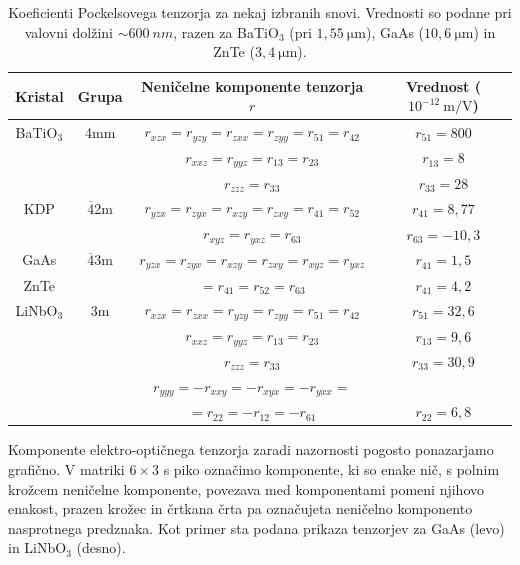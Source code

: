 \begin{table}[h!]
 \centering
\begin{tabular}{|c|c|c|c|} \hline  
      Kristal & Grupa & Neničelne komponente tenzorja $r$ & Vrednost ($10^{-12}~\si{\m/\V}$)\\ \hline
      BaTiO$_3$\index{BaTiO$_3$} & 4mm & $r_{xzx} = r_{yzy} = r_{zxx} = r_{zyy} = 
      r_{51} = r_{42}$  &
	    $r_{51} = 800$ \\
	      & & $r_{xxz} = r_{yyz} = r_{13} = r_{23}$ &  $r_{13} = 8$ \\
	      & & $r_{zzz} = r_{33}$ & $r_{33} = 28$ \\ \hline
      KDP\index{KDP} & 
      $\overline{4}$2m & $r_{yzx} = r_{zyx} = r_{xzy} = r_{zxy} = r_{41} = r_{52}$  &
	    $r_{41} = 8,77$ \\
	    & & $r_{xyz} = r_{yxz} = r_{63}$ &  $r_{63} = -10,3$ \\ \hline
      GaAs\index{GaAs}\index{ZnTe} &  $\overline{4}$3m&
	  $r_{yzx} = r_{zyx} = r_{xzy} = r_{zxy} = r_{xyz} = r_{yxz}$  & 
	   $r_{41} = 1,5$ \\
	ZnTe  & &   $= r_{41} = r_{52}=r_{63}$  & $r_{41} = 4,2$ 
	    \\ \hline
      LiNbO$_3$\index{LiNbO$_3$} & 3m & $r_{xzx} = r_{zxx} = r_{yzy} = r_{zyy} = r_{51} = r_{42}$  &
	    $r_{51} = 32,6$ \\
	     & & $r_{xxz} = r_{yyz} = r_{13} = r_{23}$ &  $r_{13} = 9,6$ \\
	      & & $r_{zzz} = r_{33}$ & $r_{33} = 30,9$ \\
	    & &  $r_{yyy} = - r_{xxy} = -r_{xyx} = -r_{yxx}  = $ & \\
	    & &  $=r_{22} =  -r_{12} =-r_{61} $  &
	    $r_{22}  = 6,8$ \\
\hline 
\end{tabular}
  \caption{Koeficienti Pockelsovega tenzorja za nekaj izbranih snovi. Vrednosti so podane 
  pri valovni dolžini $\sim 600~\si{nm}$, razen za BaTiO$_3$ (pri $1,55~\si{\micro\metre}$), 
  GaAs ($10,6~\si{\micro\metre}$) in ZnTe ($3,4~\si{\micro\metre}$).}
\label{table:Pockels}
\end{table}

\begin{remark}
Komponente elektro-optičnega tenzorja zaradi nazornosti pogosto ponazarjamo grafično. V matriki $6\times 3$
s piko označimo komponente, ki so enake nič, s polnim krožcem neničelne komponente, povezava med 
komponentami pomeni njihovo enakost, prazen krožec in črtkana črta pa označujeta 
neničelno komponento nasprotnega predznaka. Kot primer sta podana prikaza tenzorjev za 
GaAs (levo) in  LiNbO$_3$ (desno).
\begin{figure}[h!]
\centering
\def\svgwidth{20truemm} 
\qquad \qquad
\def\svgwidth{20truemm} 

\end{figure}
\end{remark}

